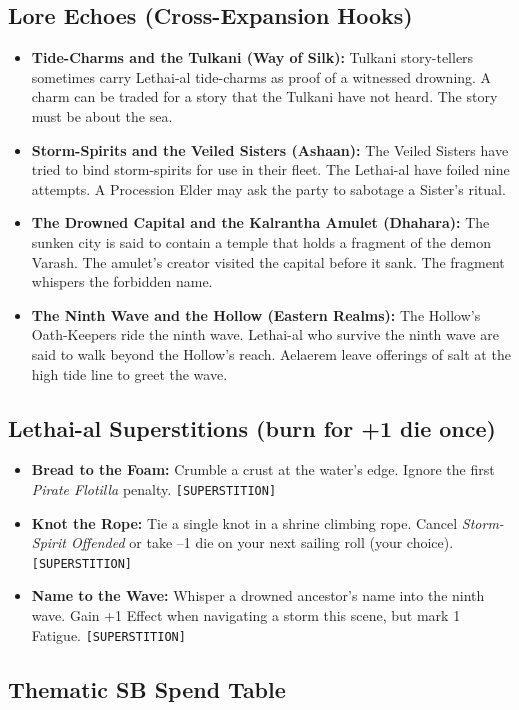 \subsection*{Lore Echoes (Cross-Expansion Hooks)}
\begin{itemize}
  \item \textbf{Tide-Charms and the Tulkani (Way of Silk):} Tulkani story-tellers sometimes carry Lethai-al tide-charms as proof of a witnessed drowning. A charm can be traded for a story that the Tulkani have not heard. The story must be about the sea.
  \item \textbf{Storm-Spirits and the Veiled Sisters (Ashaan):} The Veiled Sisters have tried to bind storm-spirits for use in their fleet. The Lethai-al have foiled nine attempts. A Procession Elder may ask the party to sabotage a Sister's ritual.
  \item \textbf{The Drowned Capital and the Kalrantha Amulet (Dhahara):} The sunken city is said to contain a temple that holds a fragment of the demon Varash. The amulet's creator visited the capital before it sank. The fragment whispers the forbidden name.
  \item \textbf{The Ninth Wave and the Hollow (Eastern Realms):} The Hollow's Oath-Keepers ride the ninth wave. Lethai-al who survive the ninth wave are said to walk beyond the Hollow's reach. Aelaerem leave offerings of salt at the high tide line to greet the wave.
\end{itemize}

\subsection*{Lethai-al Superstitions (burn for +1 die once)}
\begin{itemize}
  \item \textbf{Bread to the Foam:} Crumble a crust at the water's edge. Ignore the first \emph{Pirate Flotilla} penalty. \texttt{[SUPERSTITION]}
  \item \textbf{Knot the Rope:} Tie a single knot in a shrine climbing rope. Cancel \emph{Storm-Spirit Offended} or take --1 die on your next sailing roll (your choice). \texttt{[SUPERSTITION]}
  \item \textbf{Name to the Wave:} Whisper a drowned ancestor's name into the ninth wave. Gain +1 Effect when navigating a storm this scene, but mark 1 Fatigue. \texttt{[SUPERSTITION]}
\end{itemize}

\subsection*{Thematic SB Spend Table}
\label{sec:lethai-al-sb}

